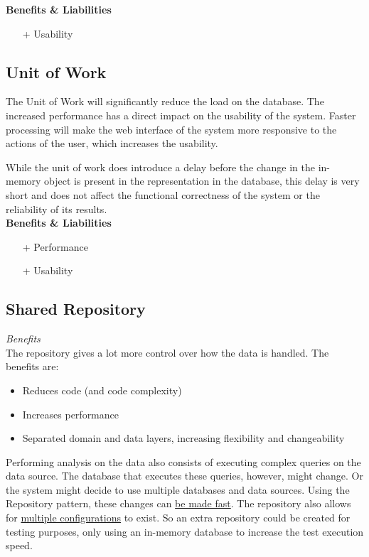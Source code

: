 \textbf{Benefits \& Liabilities} ~
\begin{itemize} 
\item[+] Usability
\end{itemize}

\subsection*{Unit of Work}
The Unit of Work will significantly reduce the load on the database. The increased performance has a direct impact on the usability of the system. Faster processing will make the web interface of the system more responsive to the actions of the user, which increases the usability.

While the unit of work does introduce a delay before the change in the in-memory object is present in the representation in the database, this delay is very short and does not affect the functional correctness of the system or the reliability of its results.\\
\textbf{Benefits \& Liabilities} ~
\begin{itemize}
\item[+] Performance 
\item[+] Usability
\end{itemize}


\subsection*{Shared Repository} 

\textit{Benefits} \\

The repository gives a lot more control over how the data is handled. The benefits are:
\begin{itemize}
\item Reduces code (and code complexity)
\item Increases performance
\item Separated domain and data layers, increasing flexibility and changeability
\end{itemize}

Performing analysis on the data also consists of executing complex queries on the data source. The database that executes these queries, however, might change. Or the system might decide to use multiple databases and data sources.
Using the Repository pattern, these changes can \underline{be made fast}. The repository also allows for \underline{multiple configurations} to exist. So an extra repository could be created for testing purposes, only using an in-memory database to increase the test execution speed. \\

